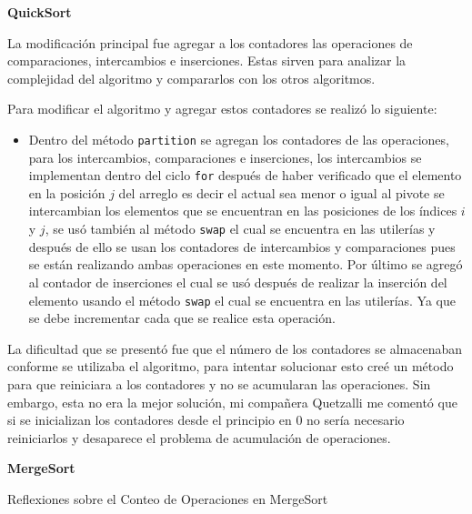 \documentclass[12pt]{article}
\begin{document}
\par\vspace{0.6cm}
\textcolor[rgb]{0.13, 0.55, 0.13}{\textbf{QuickSort}}
\par\vspace{0.4cm}
La modificación principal fue agregar a los contadores las operaciones de comparaciones, intercambios e inserciones. Estas sirven para analizar la complejidad del algoritmo y compararlos con los otros algoritmos.
\par\vspace{0.4cm}
Para modificar el algoritmo y agregar estos contadores se realizó lo siguiente:
\begin{itemize}
    \item Dentro del método \texttt{partition} se agregan los contadores de las operaciones, para los intercambios, comparaciones e inserciones, los intercambios se implementan dentro del ciclo \texttt{for} después de haber verificado que el elemento en la posición $j$ del arreglo es decir el actual sea menor o igual al pivote se intercambian los elementos que se encuentran en las posiciones de los índices $i$ y $j$, se usó también al método \texttt{swap} el cual se encuentra en las utilerías y después de ello se usan los contadores de intercambios y comparaciones pues se están realizando ambas operaciones en este momento. Por último se agregó al contador de inserciones el cual se usó después de realizar la inserción del elemento usando el método \texttt{swap} el cual se encuentra en las utilerías. Ya que se debe incrementar cada que se realice esta operación.
\end{itemize}
\par\vspace{0.4cm}
La dificultad que se presentó fue que el número de los contadores se almacenaban conforme se utilizaba el algoritmo, para intentar solucionar esto creé un método para que reiniciara a los contadores y no se acumularan las operaciones. Sin embargo, esta no era la mejor solución, mi compañera Quetzalli me comentó que si se inicializan los contadores desde el principio en 0 no sería necesario reiniciarlos y desaparece el problema de acumulación de operaciones.
\par\vspace{0.6cm}
\textcolor[rgb]{0.13, 0.55, 0.13}{\textbf{MergeSort}}
\par\vspace{0.4cm}
Reflexiones sobre el Conteo de Operaciones en MergeSort
\par\vspace{0.4cm}
\end{document}
